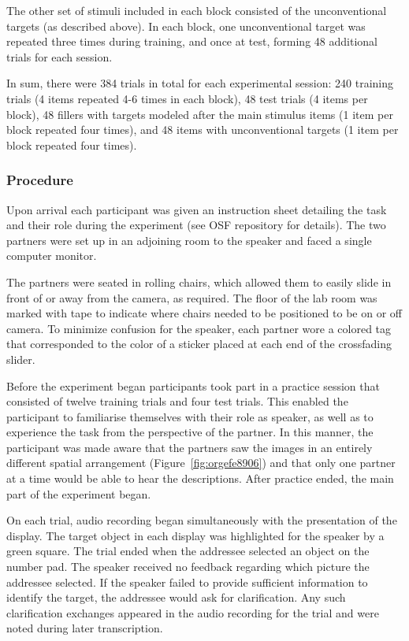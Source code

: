 \documentclass[natbib,man,a4paper]{apa6}
\begin{document}
The other set of stimuli included in each block consisted of the unconventional targets (as described above). In each block, one unconventional target was repeated three times during training, and once at test, forming 48 additional trials for each session.

In sum, there were 384 trials in total for each experimental session: 240 training trials (4 items repeated 4-6 times in each block), 48 test trials (4 items per block), 48 fillers with targets modeled after the main stimulus items (1 item per block repeated four times), and 48 items with unconventional targets (1 item per block repeated four times).

\subsubsection*{Procedure}
\label{sec:orgb078f1b}

Upon arrival each participant was given an instruction sheet detailing the task and their role during the experiment (see OSF repository for details). The two partners were set up in an adjoining room to the speaker and faced a single computer monitor. 

The partners were seated in rolling chairs, which allowed them to easily slide in front of or away from the camera, as required. The floor of the lab room was marked with tape to indicate where chairs needed to be positioned to be on or off camera. To minimize confusion for the speaker, each partner wore a colored tag that corresponded to the color of a sticker placed at each end of the crossfading slider. 

Before the experiment began participants took part in a practice session that consisted of twelve training trials and four test trials.  This enabled the participant to familiarise themselves with their role as speaker, as well as to experience the task from the perspective of the partner. In this manner, the participant was made aware that the partners saw the images in an entirely different spatial arrangement (Figure~\ref{fig:orgefe8906}) and that only one partner at a time would be able to hear the descriptions. After practice ended, the main part of the experiment began.

On each trial, audio recording began simultaneously with the presentation of the display. The target object in each display was highlighted for the speaker by a green square. The trial ended when the addressee selected an object on the number pad. The speaker received no feedback regarding which picture the addressee selected. If the speaker failed to provide sufficient information to identify the target, the addressee would ask for clarification. Any such clarification exchanges appeared in the audio recording for the trial and were noted during later transcription.
\end{document}

